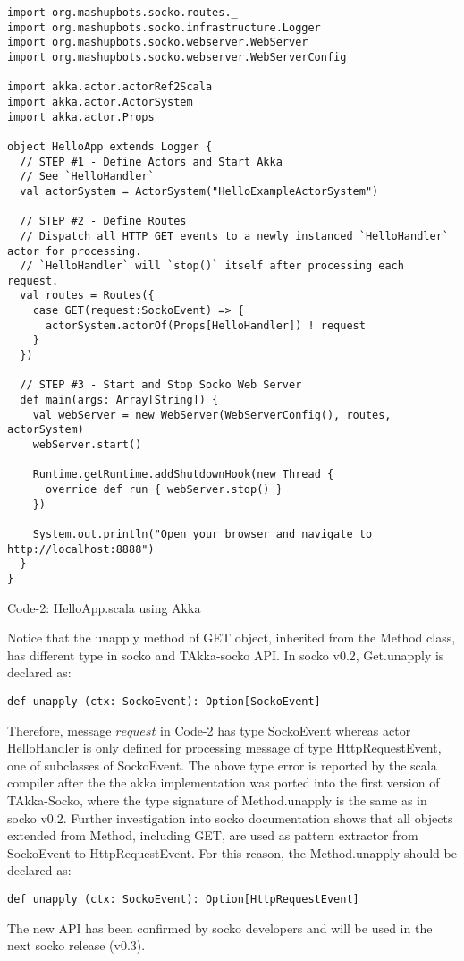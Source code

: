 \documentclass[11pt, a4paper]{article}
\begin{document}
\begin{lstlisting}
import org.mashupbots.socko.routes._
import org.mashupbots.socko.infrastructure.Logger
import org.mashupbots.socko.webserver.WebServer
import org.mashupbots.socko.webserver.WebServerConfig

import akka.actor.actorRef2Scala
import akka.actor.ActorSystem
import akka.actor.Props

object HelloApp extends Logger {
  // STEP #1 - Define Actors and Start Akka
  // See `HelloHandler`
  val actorSystem = ActorSystem("HelloExampleActorSystem")

  // STEP #2 - Define Routes
  // Dispatch all HTTP GET events to a newly instanced `HelloHandler` actor for processing.
  // `HelloHandler` will `stop()` itself after processing each request.
  val routes = Routes({
    case GET(request:SockoEvent) => {
      actorSystem.actorOf(Props[HelloHandler]) ! request
    }
  })

  // STEP #3 - Start and Stop Socko Web Server
  def main(args: Array[String]) {
    val webServer = new WebServer(WebServerConfig(), routes, actorSystem)
    webServer.start()

    Runtime.getRuntime.addShutdownHook(new Thread {
      override def run { webServer.stop() }
    })

    System.out.println("Open your browser and navigate to http://localhost:8888")
  }
}
\end{lstlisting}
\begin{center}Code-2: HelloApp.scala using Akka\end{center}

Notice that the unapply method of GET object, inherited from the Method class, has different type in socko and TAkka-socko API.  In socko v0.2, Get.unapply is declared as:
\begin{lstlisting}
def unapply (ctx: SockoEvent): Option[SockoEvent]
\end{lstlisting}
 Therefore, message $request$ in Code-2 has type SockoEvent whereas actor HelloHandler is only defined for processing message of type HttpRequestEvent, one of subclasses of SockoEvent.  The above type error is reported by the scala compiler after the the akka implementation was ported into the first version of TAkka-Socko, where the type signature of Method.unapply is the same as in  socko v0.2.  Further investigation into socko documentation shows that all objects extended from Method, including GET, are used as pattern extractor from SockoEvent to HttpRequestEvent.  For this reason,  the Method.unapply should be declared as:
\begin{lstlisting}
def unapply (ctx: SockoEvent): Option[HttpRequestEvent]
\end{lstlisting}
The new API has been confirmed by socko developers and will be used in the next socko release (v0.3).
\end{document}
